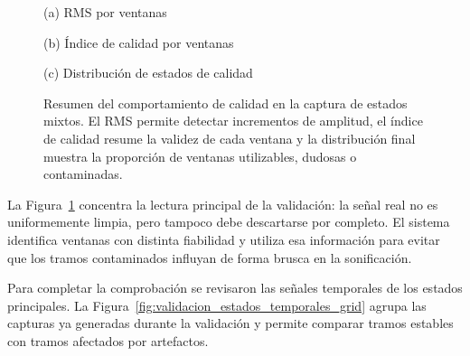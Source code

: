 \begin{figure}[!htbp]
    \centering
    \begin{minipage}{0.78\textwidth}
        \centering
        \small (a) RMS por ventanas
    \end{minipage}

    \vspace{0.20cm}

    \begin{minipage}{0.78\textwidth}
        \centering
        \small (b) Índice de calidad por ventanas
    \end{minipage}

    \vspace{0.20cm}

    \begin{minipage}{0.62\textwidth}
        \centering
        \small (c) Distribución de estados de calidad
    \end{minipage}
    \caption{Resumen del comportamiento de calidad en la captura de estados mixtos. El RMS permite detectar incrementos de amplitud, el índice de calidad resume la validez de cada ventana y la distribución final muestra la proporción de ventanas utilizables, dudosas o contaminadas.}
    \label{fig:validacion_calidad_resumen}
\end{figure}

La Figura~\ref{fig:validacion_calidad_resumen} concentra la lectura principal de la validación: la señal real no es uniformemente limpia, pero tampoco debe descartarse por completo. El sistema identifica ventanas con distinta fiabilidad y utiliza esa información para evitar que los tramos contaminados influyan de forma brusca en la sonificación.

Para completar la comprobación se revisaron las señales temporales de los estados principales. La Figura~\ref{fig:validacion_estados_temporales_grid} agrupa las capturas ya generadas durante la validación y permite comparar tramos estables con tramos afectados por artefactos.

